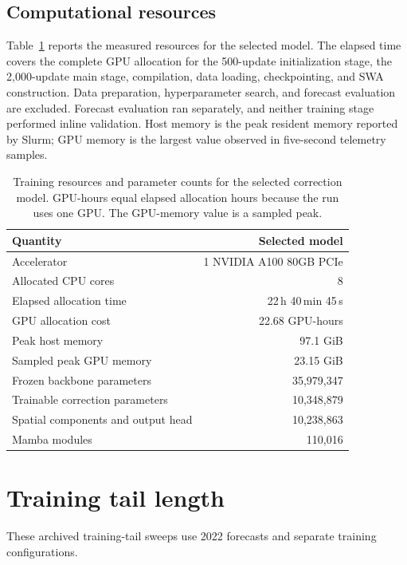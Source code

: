 \documentclass[11pt]{article}
\begin{document}
\clearpage
\subsection{Computational resources}
\label{app:computational_resources}

Table~\ref{tab:computational_resources} reports the measured resources for the selected model. The elapsed time covers the complete GPU allocation for the 500-update initialization stage, the 2,000-update main stage, compilation, data loading, checkpointing, and SWA construction. Data preparation, hyperparameter search, and forecast evaluation are excluded. Forecast evaluation ran separately, and neither training stage performed inline validation. Host memory is the peak resident memory reported by Slurm; GPU memory is the largest value observed in five-second telemetry samples.

\begin{table}[!htbp]
    \centering
    \small
    \begin{tabular}{@{}lr@{}}
        \toprule
        Quantity & Selected model \\
        \midrule
        Accelerator & 1 NVIDIA A100 80GB PCIe \\
        Allocated CPU cores & 8 \\
        Elapsed allocation time & 22\,h 40\,min 45\,s \\
        GPU allocation cost & 22.68 GPU-hours \\
        Peak host memory & 97.1 GiB \\
        Sampled peak GPU memory & 23.15 GiB \\
        \addlinespace
        Frozen backbone parameters & 35,979,347 \\
        Trainable correction parameters & 10,348,879 \\
        \quad Spatial components and output head & 10,238,863 \\
        \quad Mamba modules & 110,016 \\
        \bottomrule
    \end{tabular}
    \caption{Training resources and parameter counts for the selected correction model. GPU-hours equal elapsed allocation hours because the run uses one GPU. The GPU-memory value is a sampled peak.}
    \label{tab:computational_resources}
\end{table}

\clearpage
\section{Training tail length}
\label{app:training_horizon}
{These archived training-tail sweeps use 2022 forecasts and separate training configurations.}
\end{document}
